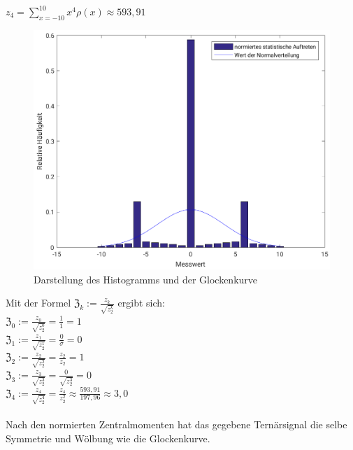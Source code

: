\documentclass[fleqn,a4paper,12pt]{article}
\begin{document}
	$z_4 = \sum_{x=-10}^{10} x^4\rho(x) \approx  593,91$\\
	\newpage
	\begin{figure}
		\includegraphics[scale = 0.9]{A8_Histogramm.png}
		\caption{Darstellung des Histogramms und der Glockenkurve}
	\end{figure}
	Mit der Formel $\mathfrak{Z}_k := \frac{z_k}{\sqrt{z_2^k}}$ ergibt sich:\\
	$\mathfrak{Z}_0 := \frac{z_0}{\sqrt{z_2^0}} = \frac{1}{1} = 1$\\
	$\mathfrak{Z}_1 := \frac{z_1}{\sqrt{z_2^1}} = \frac{0}{\sigma} = 0$\\
	$\mathfrak{Z}_2 := \frac{z_2}{\sqrt{z_2^2}} = \frac{z_2}{z_2} = 1$\\
	$\mathfrak{Z}_3 := \frac{z_3}{\sqrt{z_2^3}} = \frac{0}{\sqrt{z_2^3}} = 0$\\
	$\mathfrak{Z}_4 := \frac{z_4}{\sqrt{z_2^4}} = \frac{z_4}{z_2^2} \approx \frac{593,91}{197,96} \approx 3,0$\\
	\\
	Nach den normierten Zentralmomenten hat das gegebene Ternärsignal die selbe Symmetrie und Wölbung wie die Glockenkurve.
\end{document}
